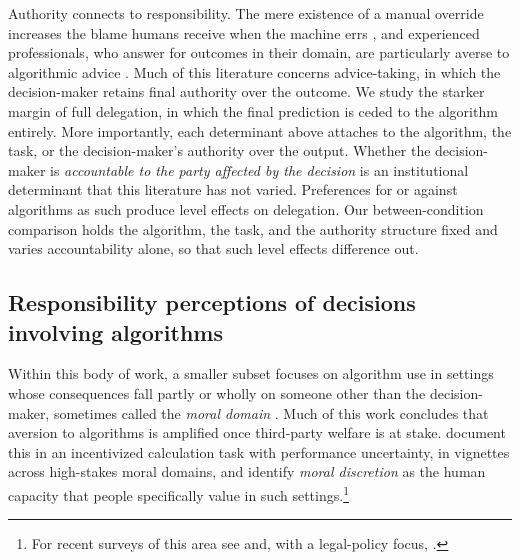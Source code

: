 Authority connects to responsibility. The mere existence of a manual override increases the blame humans receive when the machine errs \citep{arnestad_manual_2024}, and experienced professionals, who answer for outcomes in their domain, are particularly averse to algorithmic advice \citep{allen_algorithm_2022}. Much of this literature concerns advice-taking, in which the decision-maker retains final authority over the outcome. We study the starker margin of full delegation, in which the final prediction is ceded to the algorithm entirely. More importantly, each determinant above attaches to the algorithm, the task, or the decision-maker's authority over the output. Whether the decision-maker is \textit{accountable to the party affected by the decision} is an institutional determinant that this literature has not varied. Preferences for or against algorithms as such produce level effects on delegation. Our between-condition comparison holds the algorithm, the task, and the authority structure fixed and varies accountability alone, so that such level effects difference out.

\subsection*{Responsibility perceptions of decisions involving algorithms}

Within this body of work, a smaller subset focuses on algorithm use in settings whose consequences fall partly or wholly on someone other than the decision-maker, sometimes called the \textit{moral domain} \citep{gogoll_rage_2018}. Much of this work concludes that aversion to algorithms is amplified once third-party welfare is at stake. \citet{gogoll_rage_2018} document this in an incentivized calculation task with performance uncertainty, \citet{bigman_people_2018} in vignettes across high-stakes moral domains, and \citet{jauernig_people_2022} identify \textit{moral discretion} as the human capacity that people specifically value in such settings.\footnote{For recent surveys of this area see \citet{bonnefon_moral_2024} and, with a legal-policy focus, \citet{sunstein_anatomy_2024}.}

